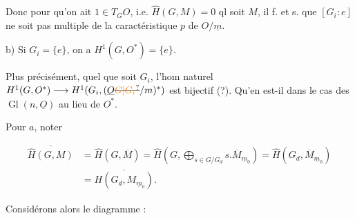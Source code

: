 Donc pour qu'on ait $1\in T_G O$, i.e. $\widehat H(G,M)=0$ ql soit $M$, il f. et s. que $[G_i:e]$ ne soit pas multiple de la caractéristique $p$ de $O/\underline m$.

b) Si $G_i=\{e\}$, on a $H^1(G,O^*)=\{e\}$.

Plus précisément, quel que soit $G_i$, l'hom naturel $H^1(G,O^*)\longrightarrow H^1(G_i,(\underline O\deleted{\unsure{G|G_i}}/m)^*)$ est bijectif (?). Qu'en est-il dans le cas  des $\operatorname{Gl}(n,\underline O)$ au lieu de $O^*$.



Pour $a$, noter

\[\begin{aligned}
\overline{\widehat H(G,M)}&=\widehat H(G,\overline M)=\widehat H(G,\bigoplus_{s\in G/G_d}s.\overline M_{\underline m_0})=\widehat H(G_d,\overline M_{\underline m_0})\\
&=\overline{H(G_d,M_{\underline m_0})}.
\end{aligned}\]


Considérons alors le diagramme :




